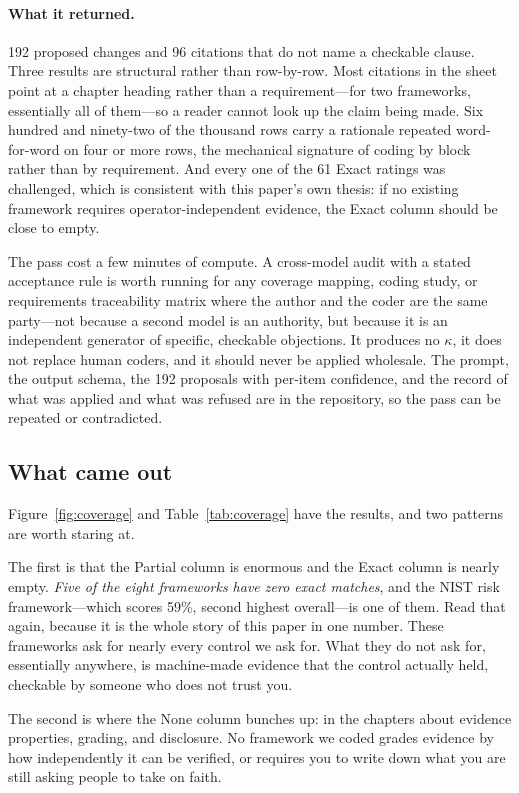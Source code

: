 \documentclass[11pt]{article}
\begin{document}
\paragraph{What it returned.} 192 proposed changes and 96 citations that do not
name a checkable clause. Three results are structural rather than row-by-row.
Most citations in the sheet point at a chapter heading rather than a
requirement---for two frameworks, essentially all of them---so a reader cannot
look up the claim being made. Six hundred and ninety-two of the thousand rows
carry a rationale repeated word-for-word on four or more rows, the mechanical
signature of coding by block rather than by requirement. And every one of the
61 Exact ratings was challenged, which is consistent with this paper's own
thesis: if no existing framework requires operator-independent evidence, the
Exact column should be close to empty.

The pass cost a few minutes of compute. A cross-model audit with a stated
acceptance rule is worth running for any coverage mapping, coding study, or
requirements traceability matrix where the author and the coder are the same
party---not because a second model is an authority, but because it is an
independent generator of specific, checkable objections. It produces no
$\kappa$, it does not replace human coders, and it should never be applied
wholesale. The prompt, the output schema, the 192 proposals with per-item
confidence, and the record of what was applied and what was refused are in the
repository, so the pass can be repeated or contradicted.

\subsection{What came out}
Figure~\ref{fig:coverage} and Table~\ref{tab:coverage} have the results, and
two patterns are worth staring at.

The first is that the Partial column is enormous and the Exact column is
nearly empty. \emph{Five of the eight frameworks have zero exact matches}, and
the NIST risk framework---which scores 59\%, second highest overall---is one of
them. Read that again, because it is the whole story of this paper in one
number. These frameworks ask for nearly every control we ask for. What they do
not ask for, essentially anywhere, is machine-made evidence that the control
actually held, checkable by someone who does not trust you.

The second is where the None column bunches up: in the chapters about evidence
properties, grading, and disclosure. No framework we coded grades evidence by
how independently it can be verified, or requires you to write down what you
are still asking people to take on faith.
\end{document}
